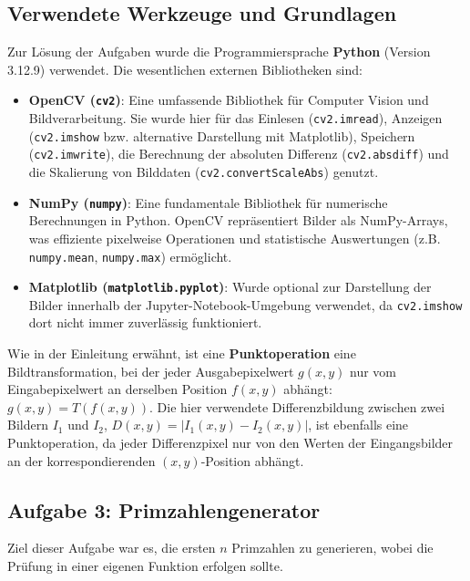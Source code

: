 \documentclass[titlepage]{article}
\begin{document}
\subsection{Verwendete Werkzeuge und Grundlagen}
Zur Lösung der Aufgaben wurde die Programmiersprache \textbf{Python} (Version 3.12.9) verwendet. Die wesentlichen externen Bibliotheken sind:
\begin{itemize}
    \item \textbf{OpenCV (\texttt{cv2})}: Eine umfassende Bibliothek für Computer Vision und Bildverarbeitung. Sie wurde hier für das Einlesen (\texttt{cv2.imread}), Anzeigen (\texttt{cv2.imshow} bzw. alternative Darstellung mit Matplotlib), Speichern (\texttt{cv2.imwrite}), die Berechnung der absoluten Differenz (\texttt{cv2.absdiff}) und die Skalierung von Bilddaten (\texttt{cv2.convertScaleAbs}) genutzt.
    \item \textbf{NumPy (\texttt{numpy})}: Eine fundamentale Bibliothek für numerische Berechnungen in Python. OpenCV repräsentiert Bilder als NumPy-Arrays, was effiziente pixelweise Operationen und statistische Auswertungen (z.B. \texttt{numpy.mean}, \texttt{numpy.max}) ermöglicht.
    \item \textbf{Matplotlib (\texttt{matplotlib.pyplot})}: Wurde optional zur Darstellung der Bilder innerhalb der Jupyter-Notebook-Umgebung verwendet, da \texttt{cv2.imshow} dort nicht immer zuverlässig funktioniert.
\end{itemize}

Wie in der Einleitung erwähnt, ist eine \textbf{Punktoperation} eine Bildtransformation, bei der jeder Ausgabepixelwert $g(x, y)$ nur vom Eingabepixelwert an derselben Position $f(x, y)$ abhängt: $g(x, y) = T(f(x, y))$. Die hier verwendete Differenzbildung zwischen zwei Bildern $I_1$ und $I_2$, $D(x, y) = |I_1(x, y) - I_2(x, y)|$, ist ebenfalls eine Punktoperation, da jeder Differenzpixel nur von den Werten der Eingangsbilder an der korrespondierenden $(x, y)$-Position abhängt.

\subsection{Aufgabe 3: Primzahlengenerator}
Ziel dieser Aufgabe war es, die ersten $n$ Primzahlen zu generieren, wobei die Prüfung in einer eigenen Funktion erfolgen sollte.
\end{document}

